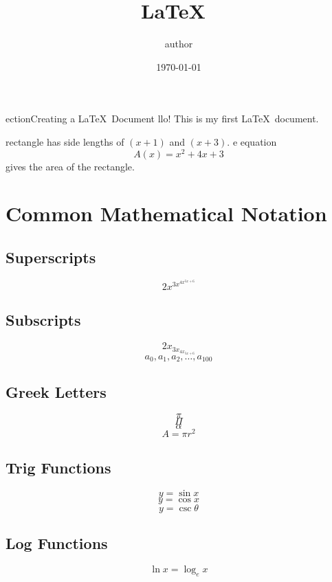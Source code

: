 \documentclass[11pt, a4paper]{article}
\title{ \LaTeX\ }
\author{author}
\date{\today}
\begin{document}
\maketitle
\thispagestyle{empty}
\pagebreak

\setcounter{page}{1}
\tableofcontents
\pagebreak
{}
\setcounter{page}{1}

\pagestyle{fancy}
\fancyhead[L]{ \LaTeX\ }
\fancyhead[R]{\nouppercase{\leftmark}}

ection{Creating a \LaTeX\ Document}
llo! This is my first \LaTeX\ document.

rectangle has side lengths of $(x + 1)$ and $(x + 3)$.
e equation $${A(x) = x^2 + 4x + 3}$$ gives the area of the rectangle.

\section{Common Mathematical Notation}

\subsection{Superscripts}

$$ 2x^{3x^{4x^{5x+6}}} $$

\subsection{Subscripts}

$$ 2x_{3x_{4x_{5x+6}}} $$
$$ a_0, a_1, a_2, \ldots, a_{100} $$

\subsection{Greek Letters}

$$ \pi $$
$$ \Pi $$
$$ \alpha $$
$$ A = \pi r^2 $$

\subsection{Trig Functions}

$$ y = \sin x $$
$$ y = \cos x $$
$$ y = \csc \theta $$

\subsection{Log Functions}

$$ \ln x = \log_e x $$
\end{document}

